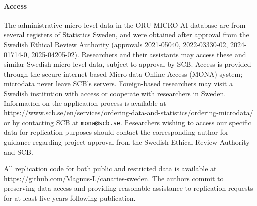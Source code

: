 \documentclass[preprint,12pt,authoryear]{elsarticle}
\begin{document}
\paragraph{Access}
The administrative micro-level data in the ORU-MICRO-AI database are from several registers of Statistics Sweden, and were obtained after approval from the Swedish Ethical Review Authority (approvals 2021-05040, 2022-03330-02, 2024-01714-0, 2025-04205-02). Researchers and their assistants may access these and similar Swedish micro-level data, subject to approval by SCB. Access is provided through the secure internet-based Micro-data Online Access (MONA) system; microdata never leave SCB's servers. Foreign-based researchers may visit a Swedish institution with access or cooperate with researchers in Sweden. Information on the application process is available at \url{https://www.scb.se/en/services/ordering-data-and-statistics/ordering-microdata/} or by contacting SCB at \texttt{mona@scb.se}. Researchers wishing to access our specific data for replication purposes should contact the corresponding author for guidance regarding project approval from the Swedish Ethical Review Authority and SCB.

All replication code for both public and restricted data is available at \url{https://github.com/Magnus-L/canaries-sweden}. The authors commit to preserving data access and providing reasonable assistance to replication requests for at least five years following publication.




\end{document}
